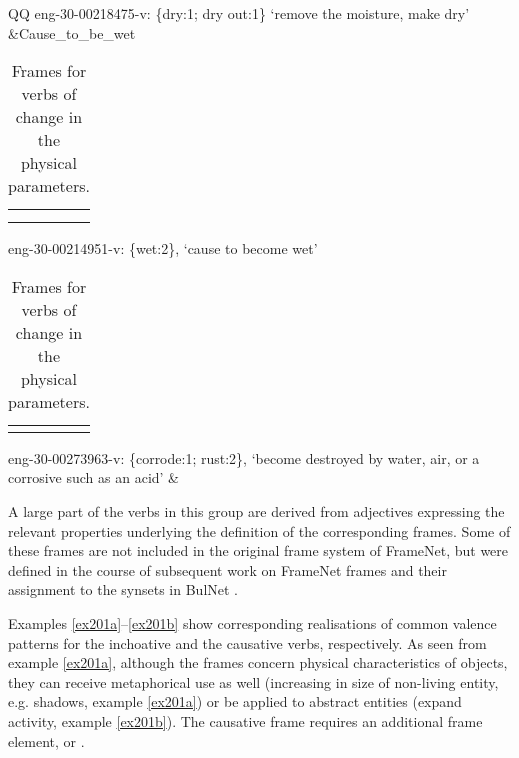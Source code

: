\documentclass[output=paper,colorlinks,citecolor=brown]{langscibook}
\begin{document}
\begin{table}
\begin{tabularx}{\textwidth}{QQ}
{} \newline eng-30-00218475-v: \{dry:1; dry out:1\} `remove the moisture, make dry' \\ \midrule
&Cause\_to\_be\_wet\newline
{\begin{tabular}{lll}
\hlblue{Patient} & \hlred{Agent}  & \hlteal{Cause}\\
\hllime{Liquid} &&
\end{tabular}
} \newline eng-30-00214951-v: \{wet:2\}, `cause to become wet'\\ \midrule
{}\newline
{\begin{tabular}{ll}
\hlblue{Patient} &
\end{tabular}
} \newline eng-30-00273963-v: \{corrode:1; rust:2\}, `become destroyed by water, air, or a corrosive such as an acid'
& \\ 
\lspbottomrule
\end{tabularx}
\caption{Frames for verbs of change in the physical parameters.}
\label{table1a}
\end{table}

A large part of the verbs in this group are derived from adjectives expressing the relevant properties underlying the definition of the corresponding frames. Some of these frames are not included in the original frame system of FrameNet, but were defined in the course of subsequent work on FrameNet frames and their assignment to the synsets in BulNet \citep{LesevaStoyanova2021change}.

Examples \ref{ex201a}--\ref{ex201b} show corresponding realisations of common valence patterns for the inchoative and the causative verbs, respectively. As seen from example \ref{ex201a}, although the frames concern physical characteristics of objects, they can receive metaphorical use as well (increasing in size of non-living entity, e.g. shadows, example \ref{ex201a}) or be applied to abstract entities (expand activity, example \ref{ex201b}). The causative frame  requires an additional frame element,  or .
\end{document}
